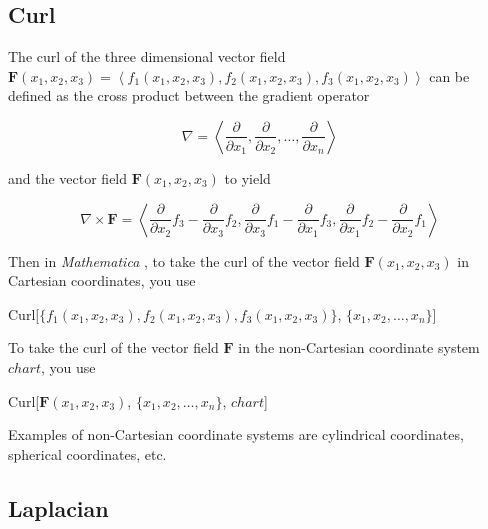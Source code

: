 \documentclass[11pt,letterpaper,twoside,titlepage]{book}
\newcommand{\Mathematica}{\textit{Mathematica} }
\begin{document}
				\subsection{Curl}
				
					The curl of the three dimensional vector field $ \mathbf{F}(x_1, x_2, x_3) = \left\langle f_1(x_1, x_2, x_3), f_2(x_1, x_2, x_3), f_3(x_1, x_2, x_3) \right\rangle $ can be defined as the cross product between the gradient operator
					
					\[ \nabla = \left\langle \frac{\partial}{\partial x_1}, \frac{\partial}{\partial x_2}, \ldots, \frac{\partial}{\partial x_n} \right\rangle \]
					
					and the vector field $ \mathbf{F}(x_1, x_2, x_3) $ to yield
					
					\[ \nabla \times \mathbf{F} = \left\langle \frac{\partial}{\partial x_2} f_3 - \frac{\partial}{\partial x_3} f_2, \frac{\partial}{\partial x_3} f_1 - \frac{\partial}{\partial x_1} f_3, \frac{\partial}{\partial x_1} f_2 - \frac{\partial}{\partial x_2} f_1 \right\rangle \]
					
					Then in \Mathematica, to take the curl of the vector field $ \mathbf{F}(x_1, x_2, x_3) $ in Cartesian coordinates, you use
					
%					
%						
%						
					
					\begin{center}
					
						Curl[$\{ f_1(x_1, x_2, x_3), f_2(x_1, x_2, x_3), f_3(x_1, x_2, x_3) \}$, $\{ x_1, x_2, \ldots, x_n \}$]
					
					\end{center}
					
					To take the curl of the vector field $\mathbf{F}$ in the non-Cartesian coordinate system $chart$, you use
					
					\begin{center}
					
						Curl[$\mathbf{F}(x_1, x_2, x_3)$, $\{ x_1, x_2, \ldots, x_n \}$, $chart$]
					
					\end{center}
					
					Examples of non-Cartesian coordinate systems are cylindrical coordinates, spherical coordinates, etc.
			
				\subsection{Laplacian}
				
\end{document}
